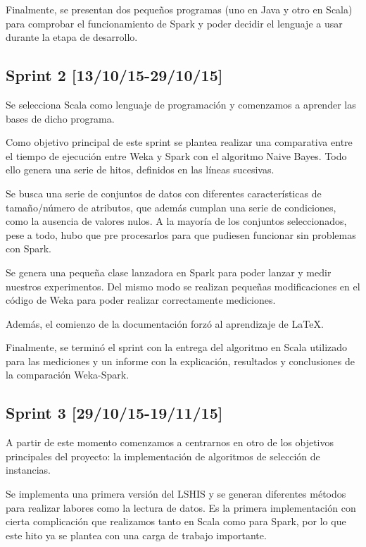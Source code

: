 Finalmente, se presentan dos pequeños programas (uno en Java y otro en Scala) para comprobar el funcionamiento de Spark y poder decidir el lenguaje a usar durante la etapa de desarrollo.

\subsection{Sprint 2 [13/10/15-29/10/15]}

Se selecciona Scala como lenguaje de programación y comenzamos a aprender las bases de dicho programa.

Como objetivo principal de este sprint se plantea realizar una comparativa entre el tiempo de ejecución entre Weka y Spark con el algoritmo Naive Bayes. Todo ello genera una serie de hitos, definidos en las líneas sucesivas.

Se busca una serie de conjuntos de datos con diferentes características de tamaño/número de atributos, que además cumplan una serie de condiciones, como la ausencia de valores nulos. A la mayoría de los conjuntos seleccionados, pese a todo, hubo que pre procesarlos para que pudiesen funcionar sin problemas con Spark.

Se genera una pequeña clase lanzadora en Spark para poder lanzar y medir nuestros experimentos. Del mismo modo se realizan pequeñas modificaciones en el código de Weka para poder realizar correctamente mediciones.

Además, el comienzo de la documentación forzó al aprendizaje de \LaTeX.

Finalmente, se terminó el sprint con la entrega del algoritmo en Scala utilizado para las mediciones y un informe con la explicación, resultados y conclusiones de la comparación Weka-Spark.

\subsection{Sprint 3 [29/10/15-19/11/15]}

A partir de este momento comenzamos a centrarnos en otro de los objetivos principales del proyecto: la implementación de algoritmos de selección de instancias.
 
Se implementa una primera versión del LSHIS y se generan diferentes métodos para realizar labores como la lectura de datos. Es la primera implementación con cierta complicación que realizamos tanto en Scala como para Spark, por lo que este hito ya se plantea con una carga de trabajo importante.

